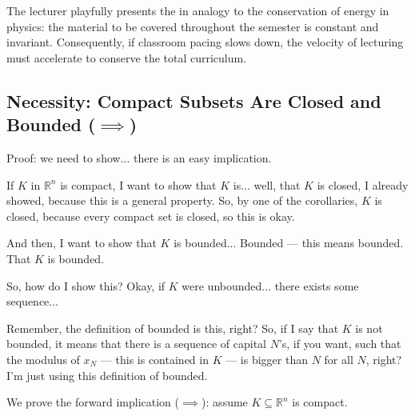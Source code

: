 \begin{insight}
The lecturer playfully presents the  in analogy to the conservation of energy in physics: the material to be covered throughout the semester is constant and invariant. Consequently, if classroom pacing slows down, the velocity of lecturing must accelerate to conserve the total curriculum.
\end{insight}

\begin{proofWrapper}

\subsection{Necessity: Compact Subsets Are Closed and Bounded (\texorpdfstring{$\implies$}{=>})}

\begin{speech}[00:44:52 - 00:46:48]
Proof: we need to show... there is an easy implication.

If $K$ in $\mathbb{R}^n$ is compact, I want to show that $K$ is... well, that $K$ is closed, I already showed, because this is a general property. So, by one of the corollaries, $K$ is closed,  because every compact set is closed, so this is okay.

And then, I want to show that $K$ is bounded...  Bounded --- this means bounded.  That $K$ is bounded.

So, how do I show this? Okay, if $K$ were unbounded...  there exists some sequence... 

Remember, the definition of bounded is this, right?  So, if I say that $K$ is not bounded, it means that there is a sequence of capital $N$'s, if you want,  such that the modulus of $x_N$ --- this is contained in $K$ --- is bigger than $N$  for all $N$,  right? I'm just using this definition of bounded.
\end{speech}

\begin{content}
We prove the forward implication ($\implies$): assume $K \subseteq \mathbb{R}^n$ is compact.


\end{content}
\end{proofWrapper}
